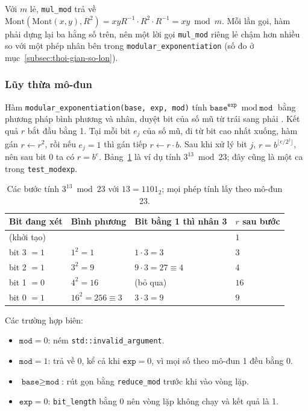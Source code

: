Với $m$ lẻ, \texttt{mul\_mod} trả về $\mathrm{Mont}(\mathrm{Mont}(x, y), R^2) = xyR^{-1} \cdot R^2 \cdot R^{-1} = xy \bmod m$. Mỗi lần gọi, hàm phải dựng lại ba hằng số trên, nên một lời gọi \texttt{mul\_mod} riêng lẻ chậm hơn nhiều so với một phép nhân bên trong \texttt{modular\_exponentiation} (số đo ở mục~\ref{subsec:thoi-gian-so-lon}).

\subsubsection{Lũy thừa mô-đun}
\label{subsec:luy-thua-mod}

Hàm \texttt{modular\_exponentiation(base, exp, mod)} tính $\texttt{base}^{\texttt{exp}} \bmod \texttt{mod}$ bằng phương pháp bình phương và nhân, duyệt bit của số mũ từ trái sang phải \cite{menezes1996handbook}. Kết quả $r$ bắt đầu bằng 1. Tại mỗi bit $e_j$ của số mũ, đi từ bit cao nhất xuống, hàm gán $r \leftarrow r^2$, rồi nếu $e_j = 1$ thì gán tiếp $r \leftarrow r \cdot b$. Sau khi xử lý bit $j$, $r = b^{\lfloor e / 2^j \rfloor}$, nên sau bit 0 ta có $r = b^e$. Bảng~\ref{tab:vi-du-modexp} là ví dụ tính $3^{13} \bmod 23$; đây cũng là một ca trong \texttt{test\_modexp}.

\begin{table}[h!]
\centering
\small
\begin{tabular}{llll}
\toprule
\textbf{Bit đang xét} & \textbf{Bình phương} & \textbf{Bit bằng 1 thì nhân 3} & \textbf{$r$ sau bước} \\
\midrule
(khởi tạo) & & & $1$ \\
bit 3 $= 1$ & $1^2 = 1$ & $1 \cdot 3 = 3$ & $3$ \\
bit 2 $= 1$ & $3^2 = 9$ & $9 \cdot 3 = 27 \equiv 4$ & $4$ \\
bit 1 $= 0$ & $4^2 = 16$ & (bỏ qua) & $16$ \\
bit 0 $= 1$ & $16^2 = 256 \equiv 3$ & $3 \cdot 3 = 9$ & $9$ \\
\bottomrule
\end{tabular}
\caption{Các bước tính $3^{13} \bmod 23$ với $13 = 1101_2$; mọi phép tính lấy theo mô-đun 23.}
\label{tab:vi-du-modexp}
\end{table}

Các trường hợp biên:
\begin{itemize}
    \item $\texttt{mod} = 0$: ném \texttt{std::invalid\_argument}.
    \item $\texttt{mod} = 1$: trả về 0, kể cả khi $\texttt{exp} = 0$, vì mọi số theo mô-đun 1 đều bằng 0.
    \item $\texttt{base} \ge \texttt{mod}$: rút gọn bằng \texttt{reduce\_mod} trước khi vào vòng lặp.
    \item $\texttt{exp} = 0$: \texttt{bit\_length} bằng 0 nên vòng lặp không chạy và kết quả là 1.
\end{itemize}

